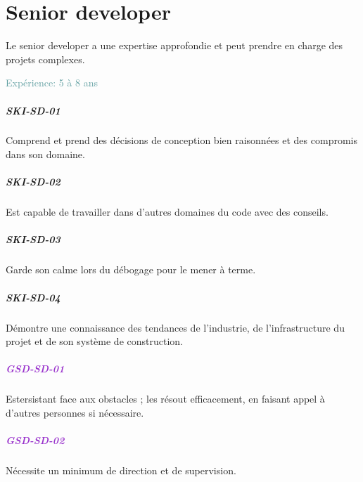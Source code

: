 \documentclass[a4paper, french, openany, 12pt]{book}
\newcommand\dex[1]{\textcolor{BrickRed}{\textbf{\uppercase{ski-{#1}}}}}
\newcommand\str[1]{\textcolor{DarkOrchid}{\textbf{\uppercase{gsd-{#1}}}}}
\newcommand\xp[1]{\textcolor{CadetBlue}{Expérience: {#1} ans}}
\begin{document}
\chapter{Senior developer}

Le senior developer a une expertise approfondie et peut prendre en charge des projets complexes.

\xp{5 à 8}

\begin{multicols}{2}

  \paragraph*{\dex{sd-01}}

  Comprend et prend des décisions de conception bien raisonnées et des compromis dans son domaine.

  \paragraph*{\dex{sd-02}}

  Est capable de travailler dans d'autres domaines du code avec des conseils.

  \paragraph*{\dex{sd-03}}

  Garde son calme lors du débogage pour le mener à terme.

  \paragraph*{\dex{sd-04}}

  Démontre une connaissance des tendances de l'industrie, de l'infrastructure du projet et de son système de
  construction.

  \paragraph*{\str{sd-01}}

  Estersistant face aux obstacles ; les résout efficacement, en faisant appel à d'autres personnes si nécessaire.

  \paragraph*{\str{sd-02}}

  Nécessite un minimum de direction et de supervision.


\end{multicols}
\end{document}
